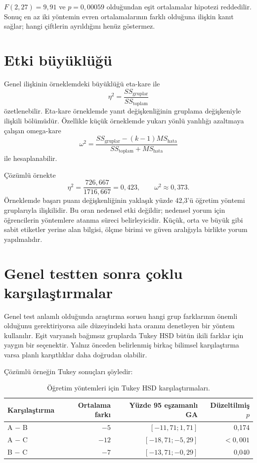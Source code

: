 $F(2,27)=9{,}91$ ve $p=0{,}00059$ olduğundan eşit ortalamalar hipotezi
reddedilir. Sonuç en az iki yöntemin evren ortalamalarının farklı olduğuna
ilişkin kanıt sağlar; hangi çiftlerin ayrıldığını henüz göstermez.

\section{Etki büyüklüğü}
\label{sec:anova-effect-size}

Genel ilişkinin örneklemdeki büyüklüğü eta-kare ile
\[
\eta^2=\frac{SS_{\text{gruplar}}}{SS_{\text{toplam}}}
\]
özetlenebilir. Eta-kare örneklemde yanıt değişkenliğinin gruplama değişkeniyle
ilişkili bölümüdür. Özellikle küçük örneklemde yukarı yönlü yanlılığı azaltmaya
çalışan omega-kare
\[
\omega^2=
\frac{SS_{\text{gruplar}}-(k-1)MS_{\text{hata}}}
{SS_{\text{toplam}}+MS_{\text{hata}}}
\]
ile hesaplanabilir.

Çözümlü örnekte
\[
\eta^2=\frac{726{,}667}{1716{,}667}=0{,}423,
\qquad
\omega^2\approx0{,}373.
\]
Örneklemde başarı puanı değişkenliğinin yaklaşık yüzde 42,3'ü öğretim yöntemi
gruplarıyla ilişkilidir. Bu oran nedensel etki değildir; nedensel yorum için
öğrencilerin yöntemlere atanma süreci belirleyicidir. Küçük, orta ve büyük
gibi sabit etiketler yerine alan bilgisi, ölçme birimi ve güven aralığıyla
birlikte yorum yapılmalıdır.

\section{Genel testten sonra çoklu karşılaştırmalar}
\label{sec:anova-posthoc}

Genel test anlamlı olduğunda araştırma sorusu hangi grup farklarının önemli
olduğunu gerektiriyorsa aile düzeyindeki hata oranını denetleyen bir yöntem
kullanılır. Eşit varyanslı bağımsız gruplarda Tukey HSD bütün ikili farklar
için yaygın bir seçenektir. Yalnız önceden belirlenmiş birkaç bilimsel
karşılaştırma varsa planlı karşıtlıklar daha doğrudan olabilir.

Çözümlü örneğin Tukey sonuçları şöyledir:

\begin{table}[H]
\centering
\caption{Öğretim yöntemleri için Tukey HSD karşılaştırmaları.}
\label{tab:anova-tukey}
\begin{tabular}{lrrr}
\toprule
Karşılaştırma & Ortalama farkı & Yüzde 95 eşzamanlı GA & Düzeltilmiş $p$ \\
\midrule
A $-$ B & $-5$ & $[-11{,}71;1{,}71]$ & 0,174 \\
A $-$ C & $-12$ & $[-18{,}71;-5{,}29]$ & $<0{,}001$ \\
B $-$ C & $-7$ & $[-13{,}71;-0{,}29]$ & 0,040 \\
\bottomrule
\end{tabular}
\end{table}

